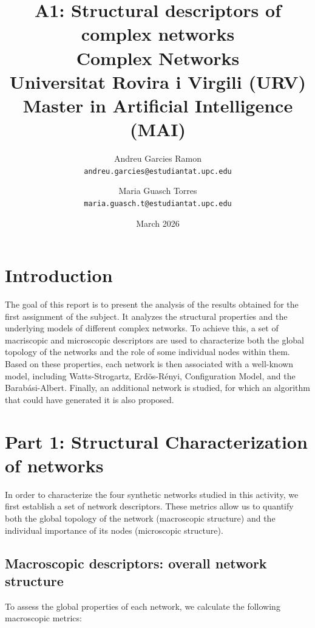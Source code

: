 \documentclass{article}
\title{
    \textbf{A1: Structural descriptors of complex networks}\\
    \large Complex Networks\\
    \small Universitat Rovira i Virgili (URV)\\
    \small Master in Artificial Intelligence (MAI)
}
\author{
    Andreu Garcies Ramon\\
    \texttt{andreu.garcies@estudiantat.upc.edu}
    \and
    Maria Guasch Torres\\
    \texttt{maria.guasch.t@estudiantat.upc.edu}
}
\date{March 2026}
\begin{document}
\maketitle

\section{Introduction}

The goal of this report is to present the analysis of the results obtained for the first assignment of the subject. It analyzes the structural properties and the underlying models of different complex networks. To achieve this, a set of macriscopic and microscopic descriptors are used to characterize both the global topology of the networks and the role of some individual nodes within them. Based on these properties, each network is then associated with a well-known model, including Watts-Strogartz, Erdös-Rényi, Configuration Model, and the Barabási-Albert. Finally, an additional network is studied, for which an algorithm that could have generated it is also proposed.


\section{Part 1: Structural Characterization of networks}\label{sec:part1}



In order to characterize the four synthetic networks studied in this activity, we first establish a set of network descriptors. These metrics allow us to quantify both the global topology of the network (macroscopic structure) and the individual importance of its nodes (microscopic structure). 

\subsection{Macroscopic descriptors: overall network structure}

To assess the global properties of each network, we calculate the following macroscopic metrics:
\end{document}

